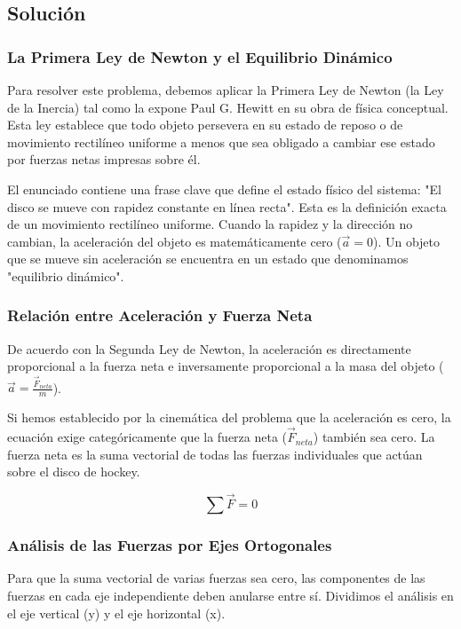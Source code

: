 \documentclass[12pt, a4paper]{article}
\begin{document}
\subsection*{Solución}

\subsubsection*{La Primera Ley de Newton y el Equilibrio Dinámico}

Para resolver este problema, debemos aplicar la Primera Ley de Newton (la Ley de la Inercia) tal como la expone Paul G. Hewitt en su obra de física conceptual. Esta ley establece que todo objeto persevera en su estado de reposo o de movimiento rectilíneo uniforme a menos que sea obligado a cambiar ese estado por fuerzas netas impresas sobre él. 

El enunciado contiene una frase clave que define el estado físico del sistema: "El disco se mueve con rapidez constante en línea recta". Esta es la definición exacta de un movimiento rectilíneo uniforme. Cuando la rapidez y la dirección no cambian, la aceleración del objeto es matemáticamente cero ($\vec{a} = 0$). Un objeto que se mueve sin aceleración se encuentra en un estado que denominamos "equilibrio dinámico".

\subsubsection*{Relación entre Aceleración y Fuerza Neta}

De acuerdo con la Segunda Ley de Newton, la aceleración es directamente proporcional a la fuerza neta e inversamente proporcional a la masa del objeto ($\vec{a} = \frac{\vec{F}_{neta}}{m}$). 

Si hemos establecido por la cinemática del problema que la aceleración es cero, la ecuación exige categóricamente que la fuerza neta ($\vec{F}_{neta}$) también sea cero. La fuerza neta es la suma vectorial de todas las fuerzas individuales que actúan sobre el disco de hockey. 

\begin{equation}
\sum \vec{F} = 0
\end{equation}

\subsubsection*{Análisis de las Fuerzas por Ejes Ortogonales}

Para que la suma vectorial de varias fuerzas sea cero, las componentes de las fuerzas en cada eje independiente deben anularse entre sí. Dividimos el análisis en el eje vertical (y) y el eje horizontal (x).
\end{document}
